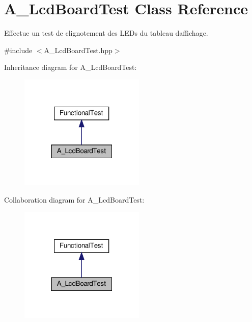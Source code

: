 \hypertarget{classA__LcdBoardTest}{}\section{A\+\_\+\+Lcd\+Board\+Test Class Reference}
\label{classA__LcdBoardTest}


Effectue un test de clignotement des L\+E\+Ds du tableau d\textquotesingle{}affichage.  




{\ttfamily \#include $<$A\+\_\+\+Lcd\+Board\+Test.\+hpp$>$}



Inheritance diagram for A\+\_\+\+Lcd\+Board\+Test\+:
\nopagebreak
\begin{figure}[H]
\begin{center}
\leavevmode
\includegraphics[width=169pt]{classA__LcdBoardTest__inherit__graph}
\end{center}
\end{figure}


Collaboration diagram for A\+\_\+\+Lcd\+Board\+Test\+:
\nopagebreak
\begin{figure}[H]
\begin{center}
\leavevmode
\includegraphics[width=169pt]{classA__LcdBoardTest__coll__graph}
\end{center}
\end{figure}
